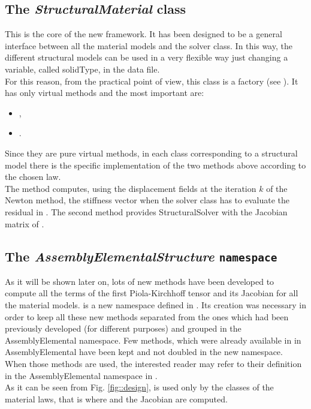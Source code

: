 \subsection{The \textit{StructuralMaterial} class} This is the core of
the new framework. It has been designed to be a general interface
between all the material models and the solver class. In this way, the
different structural models can be used in a very flexible way just
changing a variable, called solidType, in the data file.\\ For this
reason, from the practical point of view, this class is a factory (see
\cite{DesignPattern}). It has only virtual methods and the most
important are:
\begin{itemize}
\item {},
\item {}.
\end{itemize}
Since they are pure virtual methods, in each class
corresponding to a structural model there is the specific
implementation of the two methods above according to the chosen law.\\
The method  computes, using the displacement
fields at the iteration $k$ of the Newton method, the stiffness vector
when the solver class has to evaluate the residual in
. The second method provides StructuralSolver
with the Jacobian matrix of \Piola.\\

\subsection{The \textit{AssemblyElementalStructure}
  \texttt{namespace}}
As it will be shown later on, lots of new methods
have been developed to compute all the terms of the first
Piola-Kirchhoff tensor and its Jacobian for all the material models.
\AES{} is a new namespace defined in \LV. Its creation was necessary in
order to keep all these new methods separated from the ones which had
been previously developed (for different purposes) and grouped in the
AssemblyElemental namespace. Few methods, which were already available
in \LV{} in AssemblyElemental have been kept and not doubled in the new
namespace. When those methods are used, the interested reader may
refer to their definition in the AssemblyElemental namespace in
.\\ As it can be seen from
Fig. \ref{fig::design}, \AES{} is used only by the classes of the
material laws, that is where \Piola{} and the Jacobian are computed.



